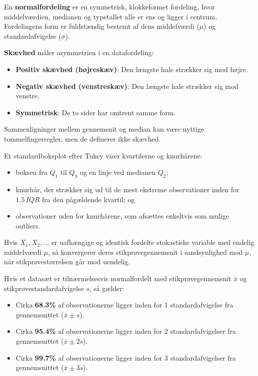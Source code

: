 \begin{definition}[Normalfordeling]
En \textbf{normalfordeling} er en symmetrisk, klokkeformet fordeling, hvor middelværdien, medianen og typetallet alle er ens og ligger i centrum. Fordelingens form er fuldstændig bestemt af dens middelværdi ($\mu$) og standardafvigelse ($\sigma$).
\end{definition}

\begin{definition}[Skævhed]
    \textbf{Skævhed} måler asymmetrien i en datafordeling:
    \begin{itemize}
        \item \textbf{Positiv skævhed (højreskæv)}: Den længste hale strækker sig mod højre.
        \item \textbf{Negativ skævhed (venstreskæv)}: Den længste hale strækker sig mod venstre.
        \item \textbf{Symmetrisk}: De to sider har omtrent samme form.
    \end{itemize}
    Sammenligninger mellem gennemsnit og median kan være nyttige tommelfingerregler, men de definerer ikke skævhed.
\end{definition}

\begin{definition}
Et standardboksplot efter Tukey viser kvartilerne og knurhårene:
\begin{itemize}
    \item boksen fra $Q_1$ til $Q_3$ og en linje ved medianen $Q_2$;
    \item knurhår, der strækker sig ud til de mest ekstreme observationer inden for $1.5\,IQR$ fra den pågældende kvartil; og
    \item observationer uden for knurhårene, som afsættes enkeltvis som mulige outliers.
\end{itemize}
\end{definition}

\begin{theorem}
    Hvis $X_1,X_2,\ldots$ er uafhængige og identisk fordelte stokastiske variable med endelig middelværdi $\mu$, så konvergerer deres stikprøvegennemsnit i sandsynlighed mod $\mu$, når stikprøvestørrelsen går mod uendelig.
\end{theorem}

\begin{theorem}
Hvis et datasæt er tilnærmelsesvis normalfordelt med stikprøvegennemsnit $\bar{x}$ og stikprøvestandardafvigelse $s$, så gælder:
\begin{itemize}
    \item Cirka \textbf{68.3\%} af observationerne ligger inden for 1 standardafvigelse fra gennemsnittet ($\bar{x} \pm s$).
    \item Cirka \textbf{95.4\%} af observationerne ligger inden for 2 standardafvigelser fra gennemsnittet ($\bar{x} \pm 2s$).
    \item Cirka \textbf{99.7\%} af observationerne ligger inden for 3 standardafvigelser fra gennemsnittet ($\bar{x} \pm 3s$).
\end{itemize}
\end{theorem}


